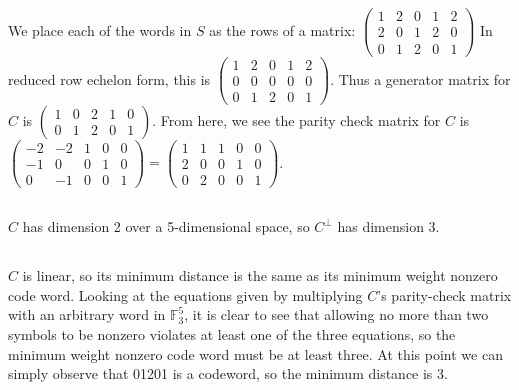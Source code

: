 \documentclass[11pt]{article}
\def\F{\mathbb{F}}
\begin{document}
\subsection{} %
We place each of the words in $S$ as the rows of a matrix:
\newline
\newline
$\begin{pmatrix}
	1 & 2 & 0 & 1 & 2 \\
	2 & 0 & 1 & 2 & 0 \\
	0 & 1 & 2 & 0 & 1
\end{pmatrix}$
\newline
\newline
In reduced row echelon form, this is 
\newline
\newline
$\begin{pmatrix}
	1 & 2 & 0 & 1 & 2 \\
	0 & 0 & 0 & 0 & 0 \\
	0 & 1 & 2 & 0 & 1
\end{pmatrix}$.
Thus a generator matrix for $C$ is
$\begin{pmatrix}
	1 & 0 & 2 & 1 & 0 \\
	0 & 1 & 2 & 0 & 1
\end{pmatrix}$.
From here, we see the parity check matrix for $C$ is
\newline
\newline
$\begin{pmatrix}
	-2 & -2 & 1 & 0 & 0 \\
	-1 & 0 & 0 & 1 & 0 \\
	0 & -1 & 0 & 0 & 1
\end{pmatrix}=
\begin{pmatrix}
	1 & 1 & 1 & 0 & 0 \\
	2 & 0 & 0 & 1 & 0 \\
	0 & 2 & 0 & 0 & 1
\end{pmatrix}$.


\subsection{} %
$C$ has dimension 2 over a 5-dimensional space, so $C^\perp$ has dimension 3.


\subsection{} %
$C$ is linear, so its minimum distance is the same as its minimum weight nonzero code word.
Looking at the equations given by multiplying $C$'s parity-check matrix with an arbitrary word in $\F_3^5$, it is clear to see that allowing no more than two symbols to be nonzero violates at least one of the three equations, so the minimum weight nonzero code word must be at least three.
At this point we can simply observe that 01201 is a codeword, so the minimum distance is 3.


\section{} %
\end{document}
